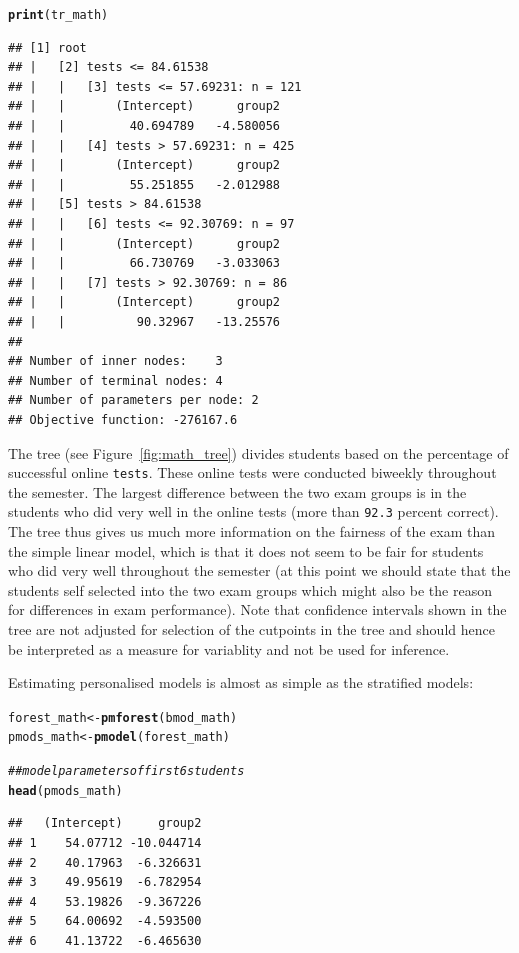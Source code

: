 \documentclass{josr}\usepackage[]{graphicx}\usepackage[]{color}
\makeatletter
\newcommand{\hlcom}[1]{\textcolor[rgb]{0.678,0.584,0.686}{\textit{#1}}}%
\newcommand{\hlstd}[1]{\textcolor[rgb]{0.345,0.345,0.345}{#1}}%
\newcommand{\hlkwb}[1]{\textcolor[rgb]{0.69,0.353,0.396}{#1}}%
\newcommand{\hlkwd}[1]{\textcolor[rgb]{0.737,0.353,0.396}{\textbf{#1}}}%
\newenvironment{kframe}{%
 \def\at@end@of@kframe{}%
 \ifinner\ifhmode%
  \def\at@end@of@kframe{\end{minipage}}%
  \begin{minipage}{\columnwidth}%
 \fi\fi%
 \def\FrameCommand##1{\hskip\@totalleftmargin \hskip-\fboxsep
 \colorbox{shadecolor}{##1}\hskip-\fboxsep
     \hskip-\linewidth \hskip-\@totalleftmargin \hskip\columnwidth}%
 \MakeFramed {\advance\hsize-\width
   \@totalleftmargin\z@ \linewidth\hsize
   \@setminipage}}%
 {\par\unskip\endMakeFramed%
 \at@end@of@kframe}
\newenvironment{knitrout}{}{} %
\newcommand{\new}[1]{{\color{blue} #1}}
\makeatother
\begin{document}
\begin{knitrout}
\color{fgcolor}\begin{kframe}
\begin{alltt}
\hlkwd{print}\hlstd{(tr_math)}
\end{alltt}
\begin{verbatim}
## [1] root
## |   [2] tests <= 84.61538
## |   |   [3] tests <= 57.69231: n = 121
## |   |       (Intercept)      group2 
## |   |         40.694789   -4.580056 
## |   |   [4] tests > 57.69231: n = 425
## |   |       (Intercept)      group2 
## |   |         55.251855   -2.012988 
## |   [5] tests > 84.61538
## |   |   [6] tests <= 92.30769: n = 97
## |   |       (Intercept)      group2 
## |   |         66.730769   -3.033063 
## |   |   [7] tests > 92.30769: n = 86
## |   |       (Intercept)      group2 
## |   |          90.32967   -13.25576 
## 
## Number of inner nodes:    3
## Number of terminal nodes: 4
## Number of parameters per node: 2
## Objective function: -276167.6
\end{verbatim}
\end{kframe}
\end{knitrout}
The tree (see Figure~\ref{fig:math_tree}) divides students based on the
percentage of successful online \texttt{\hlstd{tests}}. These online tests were
conducted biweekly throughout the semester.  The largest difference between the
two exam groups is in the students who did very well in the online tests (more
than \texttt{92.3} percent correct). The
tree thus gives us much more information on the fairness of the exam than the
simple linear model, which is that it does not seem to be fair for students who
did very well throughout the semester (at this point we should state that the
students self selected into the two exam groups which might also be the reason
for differences in exam performance).
\new{Note that confidence intervals shown in the tree are not adjusted for
selection of the cutpoints in the tree and
should hence be interpreted as a measure for variablity and not be used for
inference.}

Estimating personalised models is almost as simple as the stratified models:
\begin{knitrout}
\color{fgcolor}\begin{kframe}
\begin{alltt}
\hlstd{forest_math} \hlkwb{<-} \hlkwd{pmforest}\hlstd{(bmod_math)}
\hlstd{pmods_math} \hlkwb{<-} \hlkwd{pmodel}\hlstd{(forest_math)}

\hlcom{## model parameters of first 6 students}
\hlkwd{head}\hlstd{(pmods_math)}
\end{alltt}
\begin{verbatim}
##   (Intercept)     group2
## 1    54.07712 -10.044714
## 2    40.17963  -6.326631
## 3    49.95619  -6.782954
## 4    53.19826  -9.367226
## 5    64.00692  -4.593500
## 6    41.13722  -6.465630
\end{verbatim}
\end{kframe}
\end{knitrout}
\end{document}
